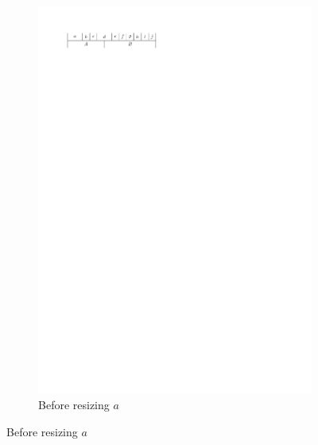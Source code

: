   \begin{figure}[b]
    \centering
    \begin{subfigure}[b]{0.45 \textwidth}
      \centering
      \includegraphics{introduction/img/2sidedBefore.pdf}
      \caption{Before resizing $a$}
      \label{fig:intro:2sidedBefore}
    \end{subfigure}


\end{figure}
